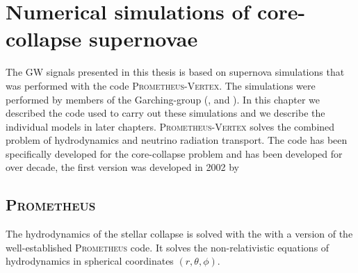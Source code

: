 
\chapter{Numerical simulations of core-collapse supernovae}
The GW signals presented in this thesis is based on 
supernova simulations that was performed with the code \textsc{Prometheus-Vertex}.
The simulations were performed by members of the Garching-group 
(\citealp{hanke_phd}, \citealp{melson_phd} and \citealp{suma_models}).
In this chapter we described the code used to carry out these simulations and 
we describe the individual models in later chapters. 
\textsc{Prometheus-Vertex} solves the combined problem of hydrodynamics and neutrino radiation transport.
The code has been specifically developed for the core-collapse problem and has been developed for over
decade, the first version was developed in 2002 by \cite{rampp_02} 
\section{\textsc{Prometheus}}
The hydrodynamics of the stellar collapse is solved with the with a version of the
well-established  \textsc{Prometheus} code. It solves the non-relativistic 
equations of hydrodynamics in spherical coordinates $(r,\theta,\phi)$.


